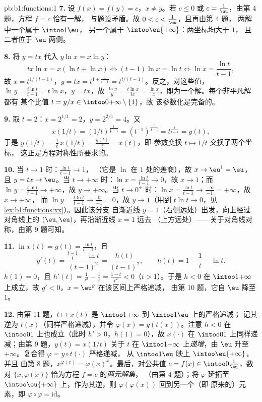 \begin{solution}{pb:b1:functions:1}
\textbf{7.} 设 $f(x) = f(y) = c$，$x \neq y$。若 $c \leq 0$ 或
$c = \frac1\eu$，由第 4 题，方程 $f = c$ 恰有一解，
与题设矛盾。故 $0 < c < \frac1\eu$，且再由第 4 题，
两解中一个属于 $\intoo1\eu$，
另一个属于 $\intoo\eu{+\infty}$：两坐标均大于 $1$，
且二者位于 $\eu$ 两侧。

\textbf{8.} 将 $y = tx$ 代入 $y\ln x = x\ln y$：
\[
tx\ln x = x(\ln t + \ln x)
\iff (t - 1)\ln x = \ln t
\iff \ln x = \frac{\ln t}{t - 1} ,
\]
故 $x = t^{1/(t-1)}$，$y = tx = t^{1 + \frac1{t-1}} =
t^{t/(t-1)}$。反之，对这些值，$\ln y = \frac{t\ln
t}{t-1} = t\ln x$，$y = tx$，故 $\frac{\ln y}y = \frac{t\ln
x}{tx} = \frac{\ln x}x$，即为一个解。每个非平凡解都有
某个比值 $t = y/x \in \intoo0{+\infty} \setminus \{1\}$，故
该参数化是完备的。

\textbf{9.} 取 $t = 2$：$x = 2^{1/1} = 2$，$y = 2^{2/1} = 4$。又
\[
x(1/t) = (1/t)^{\frac1{\frac1t - 1}}
= (t^{-1})^{\frac{t}{1 - t}}
= t^{\frac{t}{t - 1}} = y(t) ,
\]
于是 $y(1/t) = \frac1t\,x(1/t) = \frac{y(t)}t = x(t)$，即
参数变换 $t \mapsto 1/t$ 交换了两个坐标，
这正是方程对称性所要求的。

\textbf{10.} 当 $t \to 1$ 时：$\frac{\ln t}{t-1} \to 1$，
（它是 $\ln$ 在 $1$ 处的差商），故 $x \to \eu^1 = \eu$，且
$y = tx \to \eu$。当 $t \to +\infty$ 时：$\ln x = \frac{\ln t}{t-1}
\to 0$，故 $x \to 1$；而 $\ln y = \frac{t\ln t}{t-1} \to
+\infty$，故 $y \to +\infty$。当 $t \to 0^+$ 时：$\ln x = \frac{\ln
t}{t-1} \to \frac{-\infty}{-1} = +\infty$，故 $x \to +\infty$，
而 $\ln y = \frac{t\ln t}{t-1} \to \frac{0}{-1} = 0$，故 $y \to
1$（用到 $t\ln t \to 0$，见\cref{ex:b1:functions:xx}）。因此该分支
自渐近线 $y = 1$（右侧远处）出发，向上经过
对角线上的 $(\eu, \eu)$，再沿渐近线 $x = 1$ 远去
（上方远处）——关于对角线对称，由第 9 题可知。

\textbf{11.} $\ln x(t) = g(t) = \frac{\ln t}{t-1}$，且
\[
g'(t) = \frac{\frac{t-1}t - \ln t}{(t-1)^2}
= \frac{h(t)}{(t-1)^2},
\qquad h(t) = 1 - \frac1t - \ln t .
\]
$h(1) = 0$，且 $h'(t) = \frac1{t^2} - \frac1t = \frac{1 -
t}{t^2} < 0$（$t > 1$）。于是 $h < 0$ 在 $\intoo1{+\infty}$ 上成立，故 $g' <
0$，$x = \eu^g$ 在该区间上严格递减，
由第 10 题，它自 $\eu$ 降至 $1$。

\textbf{12.} 由第 11 题，$t \mapsto x(t)$ 是
$\intoo1{+\infty}$ 到 $\intoo1\eu$ 上的严格递减；
记其逆为 $t(x)$（同样严格递减），并令
$\varphi(x) = y(t(x))$。注意 $h < 0$ 在 $\intoo01$ 上也成立（此时
$h' > 0$，$h(1) = 0$），故 $x(\cdot)$ 在
$\intoo01$ 上同样递减；由第 9 题，$y(t) = x(1/t)$ 关于 $t$ 在
$\intoo1{+\infty}$ 上\emph{递增}，由 $\eu$ 升至
$+\infty$。复合得 $\varphi = y \circ t(\cdot)$ 严格递减，
从 $\intoo1\eu$ 映上 $\intoo\eu{+\infty}$，并且
由第 8 题，$x^{\varphi(x)} = \varphi(x)^x$。最后，对公共值
$c = f(x) \in \intoo0{\frac1\eu}$，数对 $\{x,
\varphi(x)\}$ 恰为方程 $f = c$ 的\emph{两元解集}，
（由第 4 题）；将 $\varphi$ 延拓至 $\intoo\eu{+\infty}$ 上，作为其逆，则
$\varphi(\varphi(x))$ 回到另一个（即
原来的）元素，即 $\varphi \circ \varphi = \mathrm{id}$。


\end{solution}
